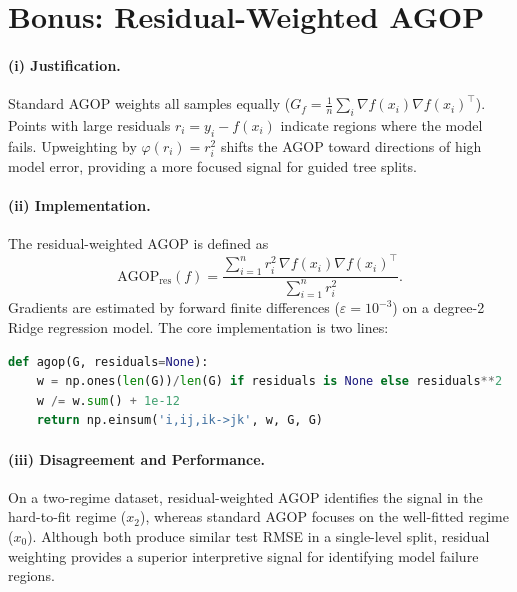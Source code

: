 
\clearpage
\section{Bonus: Residual-Weighted AGOP}
\label{app:bonus}

\paragraph{(i) Justification.}
Standard AGOP weights all samples equally ($G_f = \tfrac{1}{n}\textstyle\sum_i \nabla f(x_i)\nabla f(x_i)^\top$).
Points with large residuals $r_i = y_i - f(x_i)$ indicate regions where the model fails.
Upweighting by $\varphi(r_i)=r_i^2$ shifts the AGOP toward directions of high model error,
providing a more focused signal for guided tree splits.

\paragraph{(ii) Implementation.}
The residual-weighted AGOP is defined as
\begin{equation}
  \mathrm{AGOP}_{\mathrm{res}}(f)
  = \frac{\displaystyle\sum_{i=1}^{n} r_i^2\,\nabla f(x_i)\nabla f(x_i)^\top}
         {\displaystyle\sum_{i=1}^{n} r_i^2}.
  \label{eq:agop-res}
\end{equation}
Gradients are estimated by forward finite differences ($\varepsilon=10^{-3}$) on a degree-2
Ridge regression model. The core implementation is two lines:
\begin{lstlisting}[language=Python, basicstyle=\ttfamily\small,
  frame=single, xleftmargin=4pt, xrightmargin=4pt, belowskip=2pt, aboveskip=2pt]
def agop(G, residuals=None):
    w = np.ones(len(G))/len(G) if residuals is None else residuals**2
    w /= w.sum() + 1e-12
    return np.einsum('i,ij,ik->jk', w, G, G)
\end{lstlisting}

\paragraph{(iii) Disagreement and Performance.}
On a two-regime dataset, residual-weighted AGOP identifies the signal in the hard-to-fit regime ($x_2$), whereas standard AGOP focuses on the well-fitted regime ($x_0$). Although both produce similar test RMSE in a single-level split, residual weighting provides a superior interpretive signal for identifying model failure regions.

